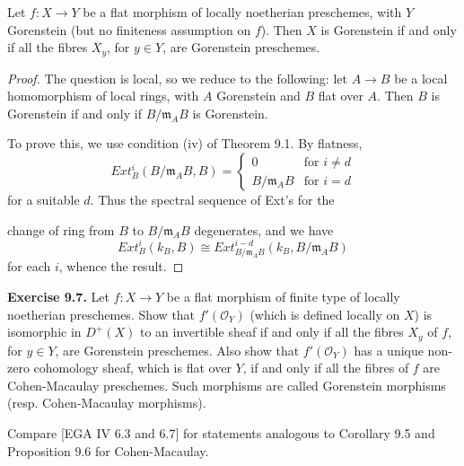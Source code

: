 \documentclass[12pt]{book}
\newcommand{\sheaf}[1]{\mathcal{#1}}
\begin{document}
\begin{proposition}
Let \(f: X \to Y\) be a flat morphism of locally noetherian preschemes, with \(Y\) Gorenstein (but no finiteness assumption on \(f\)).
Then \(X\) is Gorenstein if and only if all the fibres \(X_{y}\), for \(y \in Y\), are Gorenstein preschemes.
\end{proposition}
\begin{proof}
The question is local, so we reduce to the following: let \(A \to B\) be a local homomorphism of local rings, with \(A\) Gorenstein and \(B\) flat over \(A\).
Then \(B\) is Gorenstein if and only if \(B / \mathfrak{m}_{A} B\) is Gorenstein.

To prove this, we use condition (iv) of Theorem 9.1.
By flatness,
\[Ext_{B}^{i}\left(B / \mathfrak{m}_{A} B, B\right)=
\begin{cases}
0 & \text{for } i \neq d \\
B / \mathfrak{m}_{A} B & \text{for } i=d
\end{cases}\]
for a suitable \(d\).
Thus the spectral sequence of Ext's for the

\setcounter{page}{298}
change of ring from \(B\) to \(B/\mathfrak{m}_A B\) degenerates, and we have
\[Ext_{B}^{i}\left(k_{B}, B\right) \cong Ext_{B / \mathfrak{m}_{A} B}^{i-d}\left(k_{B}, B / \mathfrak{m}_{A} B\right)\]
for each \(i\), whence the result.
\end{proof}

\textbf{Exercise 9.7.}
Let \(f: X \to Y\) be a flat morphism of finite type of locally noetherian preschemes.
Show that \(f'(\sheaf{O}_{Y})\) (which is defined locally on \(X\)) is isomorphic in \(D^{+}(X)\) to an invertible sheaf if and only if all the fibres \(X_{y}\) of \(f\), for \(y \in Y\), are Gorenstein preschemes.
Also show that \(f'(\sheaf{O}_{Y})\) has a unique non-zero cohomology sheaf, which is flat over \(Y\), if and only if all the fibres of \(f\) are Cohen-Macaulay preschemes.
Such morphisms are called Gorenstein morphisms (resp. Cohen-Macaulay morphisms).

Compare [EGA IV 6.3 and 6.7] for statements analogous to Corollary 9.5 and Proposition 9.6 for Cohen-Macaulay.
\end{document}
